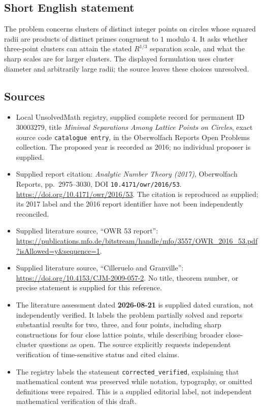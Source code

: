 \documentclass[11pt]{article}
\begin{document}
\subsection{Short English statement}
The problem concerns clusters of distinct integer points on circles whose squared radii are products of distinct primes congruent to \(1\) modulo \(4\). It asks whether three-point clusters can attain the stated \(R^{1/3}\) separation scale, and what the sharp scales are for larger clusters. The displayed formulation uses cluster diameter and arbitrarily large radii; the source leaves these choices unresolved.
\subsection{Sources}
\begin{itemize}
\item Local UnsolvedMath registry, supplied complete record for permanent ID \(30003279\), title \emph{Minimal Separations Among Lattice Points on Circles}, exact source code \texttt{catalogue entry}, in the Oberwolfach Reports Open Problems collection. The proposed year is recorded as 2016; no individual proposer is supplied.
\item Supplied report citation: \emph{Analytic Number Theory (2017)}, Oberwolfach Reports, pp.\ 2975--3030, DOI \texttt{10.4171/owr/2016/53}. \url{https://doi.org/10.4171/owr/2016/53}. The citation is reproduced as supplied; its 2017 label and the 2016 report identifier have not been independently reconciled.
\item Supplied literature source, ``OWR 53 report'': \url{https://publications.mfo.de/bitstream/handle/mfo/3557/OWR_2016_53.pdf?isAllowed=y&sequence=1}.
\item Supplied literature source, ``Cilleruelo and Granville'': \url{https://doi.org/10.4153/CJM-2009-057-2}. No title, theorem number, or precise statement is supplied for this reference.
\item The literature assessment dated \textbf{2026-08-21} is supplied dated curation, not independently verified. It labels the problem partially solved and reports substantial results for two, three, and four points, including sharp constructions for four close lattice points, while describing broader close-cluster questions as open. The source explicitly requests independent verification of time-sensitive status and cited claims.
\item The registry labels the statement \texttt{corrected\_verified}, explaining that mathematical content was preserved while notation, typography, or omitted definitions were repaired. This is a supplied editorial label, not independent mathematical verification of this draft.
\end{itemize}
\end{document}
